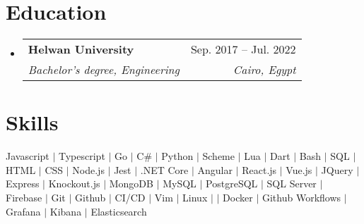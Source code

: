 \documentclass[letterpaper,11pt]{article}
\makeatletter
\newcommand{\resumeSubheading}[4]{
  \vspace{-2pt}\item
    \begin{tabular*}{0.97\textwidth}[t]{l@{\extracolsep{\fill}}r}
      \textbf{#1} & #2 \\
      \textit{\small#3} & \textit{\small #4} \\
    \end{tabular*}\vspace{-7pt}
}
\newcommand{\resumeSubHeadingListStart}{\begin{itemize}[leftmargin=0.15in, label={}]}
\newcommand{\resumeSubHeadingListEnd}{\end{itemize}}
\makeatother
\begin{document}
\section{Education}
  \resumeSubHeadingListStart
    \resumeSubheading
      {Helwan University}{Sep. 2017 -- Jul. 2022}
      {Bachelor's degree, Engineering}{Cairo, Egypt}
\resumeSubHeadingListEnd

%
\section{Skills}
 \begin{itemize}[leftmargin=0.15in, label={}]
    \small{\item{
     {Javascript $|$ Typescript $|$ Go $|$ C\# $|$ Python $|$ Scheme $|$ Lua $|$ Dart $|$ Bash $|$ SQL $|$ HTML $|$ CSS $|$ Node.js $|$ Jest $|$ .NET Core $|$ Angular $|$ React.js $|$ Vue.js $|$ JQuery $|$ Express $|$ Knockout.js $|$ MongoDB $|$ MySQL $|$ PostgreSQL $|$ SQL Server $|$ Firebase $|$ Git $|$ Github $|$ CI/CD $|$ Vim $|$ Linux $|$  $|$ Docker $|$ Github Workflows $|$ Grafana $|$ Kibana $|$ Elasticsearch}
    }}
 \end{itemize}


\end{document}

